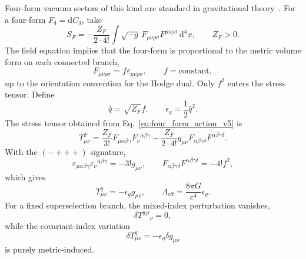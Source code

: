 \documentclass[
  aps,
  prd,
  reprint,
  superscriptaddress,
  floatfix,
  nofootinbib,
  longbibliography
]{revtex4-2}
\theoremstyle{plain}
\theoremstyle{definition}
\theoremstyle{remark}
\newcommand{\dd}{\mathrm d}
\newcommand{\eff}{\mathrm{eff}}
\newcommand{\eps}{\epsilon}
\newcommand{\qhat}{\widehat q}
\begin{document}
Four-form vacuum sectors of this kind are standard in gravitational theory~\cite{Aurilia,HenneauxTeitelboim,BrownTeitelboim,BoussoPolchinski}.  For a four-form \(F_4=\dd C_3\), take
\begin{equation}
S_F=-\frac{Z_F}{2\cdot4!}\int \sqrt{-g}\,
F_{\mu\nu\rho\sigma}F^{\mu\nu\rho\sigma}\,\dd^4x,
\qquad Z_F>0 .
\label{eq:four_form_action_v5}
\end{equation}
The field equation implies that the four-form is proportional to the metric
volume form on each connected branch,
\begin{equation}
F_{\mu\nu\rho\sigma}=f\varepsilon_{\mu\nu\rho\sigma},
\qquad
f=\text{constant},
\label{eq:four_form_branch_v8}
\end{equation}
up to the orientation convention for the Hodge dual.  Only \(f^2\) enters the
stress tensor.  Define
\begin{equation}
\qhat=\sqrt{Z_F}f,
\qquad
\eps_q=\frac12\qhat^2 .
\label{eq:four_form_energy_v5}
\end{equation}
The stress tensor obtained from Eq.~\eqref{eq:four_form_action_v5} is
\begin{equation}
T^F_{\mu\nu}
=
\frac{Z_F}{3!}F_{\mu\alpha\beta\gamma}
F_{\nu}{}^{\alpha\beta\gamma}
-
\frac{Z_F}{2\cdot4!}g_{\mu\nu}F_{\alpha\beta\gamma\delta}
F^{\alpha\beta\gamma\delta} .
\label{eq:four_form_stress_general_v7}
\end{equation}
With the \((-+++)\) signature,
\begin{equation}
\varepsilon_{\mu\alpha\beta\gamma}
\varepsilon_{\nu}{}^{\alpha\beta\gamma}=-3!g_{\mu\nu},
\qquad
F_{\alpha\beta\gamma\delta}F^{\alpha\beta\gamma\delta}=-4!f^2,
\end{equation}
which gives
\begin{equation}
T^q_{\mu\nu}=-\eps_q g_{\mu\nu},
\qquad
\Lambda_{\eff}=\frac{8\pi G}{c^4}\eps_q .
\label{eq:four_form_stress_v5}
\end{equation}
For a fixed superselection branch, the mixed-index perturbation vanishes,
\begin{equation}
\delta T^{q\,\mu}{}_{\nu}=0,
\label{eq:mixed_index_four_form_v5}
\end{equation}
while the covariant-index variation
\begin{equation}
\delta T^q_{\mu\nu}=-\eps_q\delta g_{\mu\nu}
\label{eq:covariant_four_form_v5}
\end{equation}
is purely metric-induced.
\end{document}
